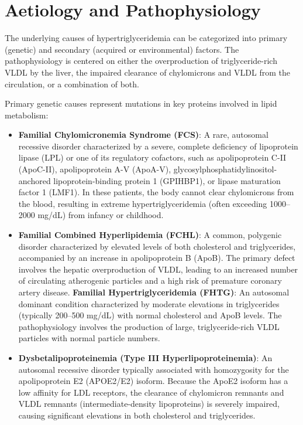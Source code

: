 \section*{Aetiology and Pathophysiology}
The underlying causes of hypertriglyceridemia can be categorized into primary (genetic) and secondary (acquired or environmental) factors. The pathophysiology is centered on either the overproduction of triglyceride-rich VLDL by the liver, the impaired clearance of chylomicrons and VLDL from the circulation, or a combination of both.

Primary genetic causes represent mutations in key proteins involved in lipid metabolism:
\begin{itemize}
    \item \textbf{Familial Chylomicronemia Syndrome (FCS)}: A rare, autosomal recessive disorder characterized by a severe, complete deficiency of lipoprotein lipase (LPL) or one of its regulatory cofactors, such as apolipoprotein C-II (ApoC-II), apolipoprotein A-V (ApoA-V), glycosylphosphatidylinositol-anchored lipoprotein-binding protein 1 (GPIHBP1), or lipase maturation factor 1 (LMF1). In these patients, the body cannot clear chylomicrons from the blood, resulting in extreme hypertriglyceridemia (often exceeding 1000--2000 mg/dL) from infancy or childhood.
    \item \textbf{Familial Combined Hyperlipidemia (FCHL)}: A common, polygenic disorder characterized by elevated levels of both cholesterol and triglycerides, accompanied by an increase in apolipoprotein B (ApoB). The primary defect involves the hepatic overproduction of VLDL, leading to an increased number of circulating atherogenic particles and a high risk of premature coronary artery disease.
    \textbf{Familial Hypertriglyceridemia (FHTG)}: An autosomal dominant condition characterized by moderate elevations in triglycerides (typically 200--500 mg/dL) with normal cholesterol and ApoB levels. The pathophysiology involves the production of large, triglyceride-rich VLDL particles with normal particle numbers.
    \item \textbf{Dysbetalipoproteinemia (Type III Hyperlipoproteinemia)}: An autosomal recessive disorder typically associated with homozygosity for the apolipoprotein E2 (APOE2/E2) isoform. Because the ApoE2 isoform has a low affinity for LDL receptors, the clearance of chylomicron remnants and VLDL remnants (intermediate-density lipoproteins) is severely impaired, causing significant elevations in both cholesterol and triglycerides.
\end{itemize}

